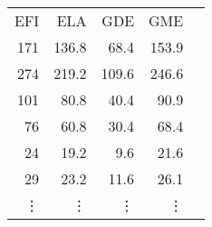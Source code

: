   \begin{tabular}{rrrrr}
EFI & ELA & GDE & GME   \\
  171 &136.8&  68.4& 153.9  \\
  274 &219.2 &109.6 &246.6 \\
  101 & 80.8&  40.4 & 90.9 \\
   76 & 60.8 & 30.4 & 68.4  \\
   24 & 19.2 &  9.6 & 21.6   \\
   29 & 23.2 & 11.6&  26.1  \\
   \vdots & \vdots & \vdots & \vdots 
\end{tabular}
